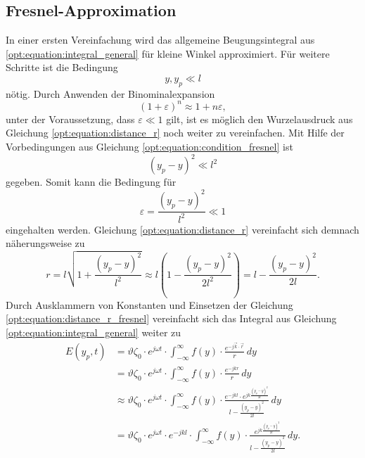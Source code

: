 \subsection{Fresnel-Approximation}
\label{opt:sec:fresnel}
In einer ersten Vereinfachung wird das allgemeine Beugungsintegral aus \eqref{opt:equation:integral_general} für kleine Winkel approximiert.
Für weitere Schritte ist die Bedingung
\begin{equation}
y, y_p
\ll
l
\label{opt:equation:condition_fresnel}
\end{equation}
nötig.
Durch Anwenden der Binominalexpansion
\begin{equation*}
(1 + \varepsilon)^n
\approx
1 + n\varepsilon
,
\end{equation*}
unter der Voraussetzung, dass $\varepsilon \ll 1$ gilt, ist es möglich den Wurzelausdruck aus Gleichung \eqref{opt:equation:distance_r} noch weiter zu vereinfachen.
Mit Hilfe der Vorbedingungen aus Gleichung \eqref{opt:equation:condition_fresnel} ist
\begin{equation*}
(y_p-y)^2
\ll
l^2
\end{equation*}
gegeben.
Somit kann die Bedingung für
\begin{equation*}
\varepsilon
=
\frac{(y_p-y)^2}{l^2}
\ll
1
\end{equation*}
eingehalten werden.
Gleichung \eqref{opt:equation:distance_r} vereinfacht sich demnach näherungsweise zu
\begin{equation}
r
=
l \sqrt{1 + \frac{(y_p-y)^2}{l^2}}
\approx
l \left(1 - \frac{(y_p-y)^2}{2l^2}\right)
=
l - \frac{(y_p-y)^2}{2l}
.
\label{opt:equation:distance_r_fresnel}
\end{equation}
Durch Ausklammern von Konstanten und Einsetzen der Gleichung \eqref{opt:equation:distance_r_fresnel} vereinfacht sich das Integral aus Gleichung \eqref{opt:equation:integral_general} weiter zu
\begin{align*}
E(y_p, t)
&=
\vartheta\zeta_0 \cdot e^{j\omega t} \cdot \int_{-\infty}^{\infty}f(y)\cdot\frac{e^{-j\vec{k}\cdot\vec{r}}}{r} \,dy
\\
&=
\vartheta\zeta_0 \cdot e^{j\omega t} \cdot \int_{-\infty}^{\infty}f(y)\cdot\frac{e^{-jkr}}{r} \,dy
\\
&\approx
\vartheta\zeta_0 \cdot e^{j\omega t} \cdot \int_{-\infty}^{\infty}f(y)\cdot\frac{e^{-jkl} \cdot e^{jk\frac{(y_p-y)^2}{2l}}}{l - \frac{(y_p-y)^2}{2l}} \,dy
\\
&=
\vartheta\zeta_0 \cdot e^{j\omega t} \cdot e^{-jkl} \cdot \int_{-\infty}^{\infty}f(y)\cdot\frac{e^{jk\frac{(y_p-y)^2}{2l}}}{l - \frac{(y_p-y)^2}{2l}} \,dy
.
\end{align*}
